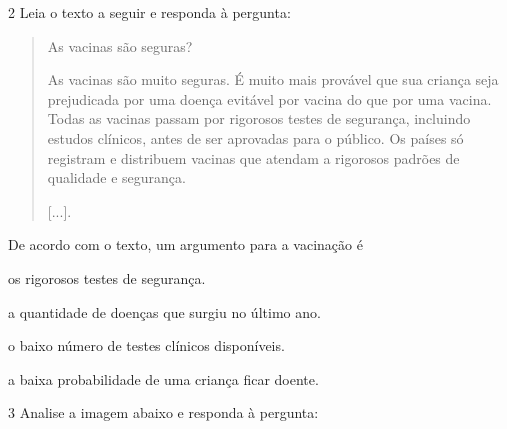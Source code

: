 \num{2} Leia o texto a seguir e responda à pergunta:

\begin{quote}
As vacinas são seguras?

As vacinas são muito seguras. É muito mais provável que sua criança seja
prejudicada por uma doença evitável por vacina do que por uma vacina.
Todas as vacinas passam por rigorosos testes de segurança, incluindo
estudos clínicos, antes de ser aprovadas para o público. Os países só
registram e distribuem vacinas que atendam a rigorosos padrões de
qualidade e segurança.

{[}...{]}.

\end{quote}

De acordo com o texto, um argumento para a vacinação é

\begin{escolha}
\item os rigorosos testes de segurança.

\item a quantidade de doenças que surgiu no último ano.

\item o baixo número de testes clínicos disponíveis.

\item a baixa probabilidade de uma criança ficar doente.
\end{escolha}


\num{3} Analise a imagem abaixo e responda à pergunta:


